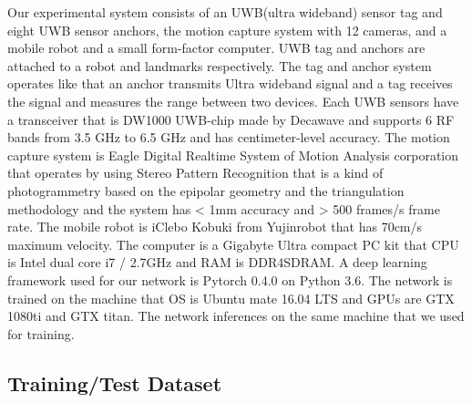 \documentclass[letterpaper, 10 pt, conference]{ieeeconf}  %
\begin{document}
Our experimental system consists of an UWB(ultra wideband) sensor tag and eight UWB sensor anchors, the motion capture system with 12 cameras, and a mobile robot and a small form-factor computer. UWB tag and anchors are attached to a robot and landmarks respectively. The tag and anchor system operates like that an anchor transmits Ultra wideband signal and a tag receives the signal and measures the range between two devices. Each UWB sensors have a transceiver that is DW1000 UWB-chip made by Decawave and supports 6 RF bands from 3.5 GHz to 6.5 GHz and has centimeter-level accuracy. The motion capture system is Eagle Digital Realtime System of Motion Analysis corporation that operates by using Stereo Pattern Recognition that is a kind of photogrammetry based on the epipolar geometry and the triangulation methodology and the system has < 1mm accuracy and > 500 frames/s frame rate. The mobile robot is iClebo Kobuki from Yujinrobot that has 70cm/s maximum velocity. The computer is a Gigabyte Ultra compact PC kit that CPU is Intel dual core i7 / 2.7GHz and RAM is DDR4SDRAM.
A deep learning framework used for our network is Pytorch 0.4.0 on Python 3.6. The network is trained on the machine that OS is Ubuntu mate 16.04 LTS and GPUs are GTX 1080ti and GTX titan. The network inferences on the same machine that we used for training.

\subsection{Training/Test Dataset}
\end{document}
